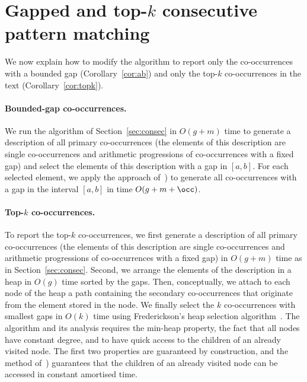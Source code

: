 \section{Gapped and top-\texorpdfstring{$k$}{k} consecutive pattern matching}
We now explain how to modify the algorithm to report only the co-occurrences with a bounded gap (Corollary~\ref{cor:ab}) and only the top-$k$ co-occurrences in the text (Corollary~\ref{cor:topk}).

\paragraph*{Bounded-gap co-occurrences.} We run the algorithm of Section~\ref{sec:consec} in $O(g+m)$ time to generate a description of all primary co-occurrences (the elements of this description are single co-occurrences and arithmetic progressions of co-occurrences with a fixed gap) and select the elements of this description with a gap in $[a,b]$. For each selected element, we apply the approach of~\cite[Section 6.4]{talg/ChristiansenEKN21}) to generate all co-occurrences with a gap in the interval $[a,b]$ in time $O(g+m+\occ)$. 

\paragraph*{Top-$k$ co-occurrences.}
To report the top-$k$ co-occurrences, we first generate a description of all primary co-occurrences (the elements of this description are single co-occurrences and arithmetic progressions of co-occurrences with a fixed gap) in $O(g+m)$ time as in Section~\ref{sec:consec}. Second,  we arrange the elements of the description in a heap in $O(g)$ time sorted by the gaps. Then, conceptually, we attach to each node of the heap a path containing the secondary co-occurrences that originate from the element stored in the node. We finally select the $k$ co-occurrences with smallest gaps in $O(k)$ time using Frederickson's heap selection algorithm~\cite{FREDERICKSON1993197}. The algorithm and its analysis requires the min-heap property, the fact that all nodes have constant degree, and to have quick access to the children of an already visited node. The first two properties are guaranteed by construction, and the method of~\cite[Section 6.4]{talg/ChristiansenEKN21}) guarantees that the children of an already visited node can be accessed in constant amortised time.
